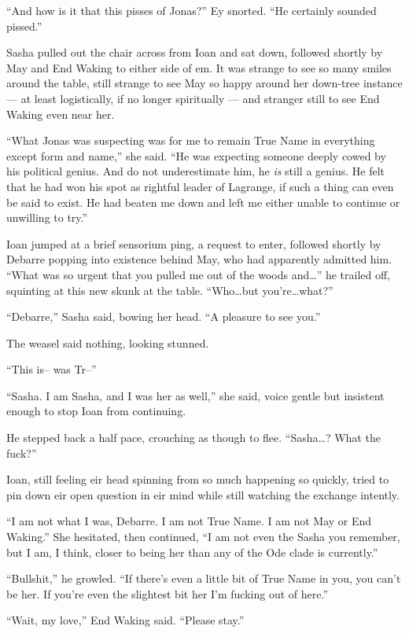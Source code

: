``And how is it that this pisses of Jonas?'' Ey snorted. ``He certainly sounded pissed.''

Sasha pulled out the chair across from Ioan and sat down, followed shortly by May and End Waking to either side of em. It was strange to see so many smiles around the table, still strange to see May so happy around her down-tree instance — at least logistically, if no longer spiritually — and stranger still to see End Waking even near her.

``What Jonas was suspecting was for me to remain True Name in everything except form and name,'' she said. ``He was expecting someone deeply cowed by his political genius. And do not underestimate him, he \emph{is} still a genius. He felt that he had won his spot as rightful leader of Lagrange, if such a thing can even be said to exist. He had beaten me down and left me either unable to continue or unwilling to try.''

Ioan jumped at a brief sensorium ping, a request to enter, followed shortly by Debarre popping into existence behind May, who had apparently admitted him. ``What was so urgent that you pulled me out of the woods and\ldots{}'' he trailed off, squinting at this new skunk at the table. ``Who\ldots but you're\ldots what?''

``Debarre,'' Sasha said, bowing her head. ``A pleasure to see you.''

The weasel said nothing, looking stunned.

``This is-- was Tr--''

``Sasha. I am Sasha, and I was her as well,'' she said, voice gentle but insistent enough to stop Ioan from continuing.

He stepped back a half pace, crouching as though to flee. ``Sasha\ldots? What the fuck?''

Ioan, still feeling eir head spinning from so much happening so quickly, tried to pin down eir open question in eir mind while still watching the exchange intently.

``I am not what I was, Debarre. I am not True Name. I am not May or End Waking.'' She hesitated, then continued, ``I am not even the Sasha you remember, but I am, I think, closer to being her than any of the Ode clade is currently.''

``Bullshit,'' he growled. ``If there's even a little bit of True Name in you, you can't be her. If you're even the slightest bit her I'm fucking out of here.''

``Wait, my love,'' End Waking said. ``Please stay.''

